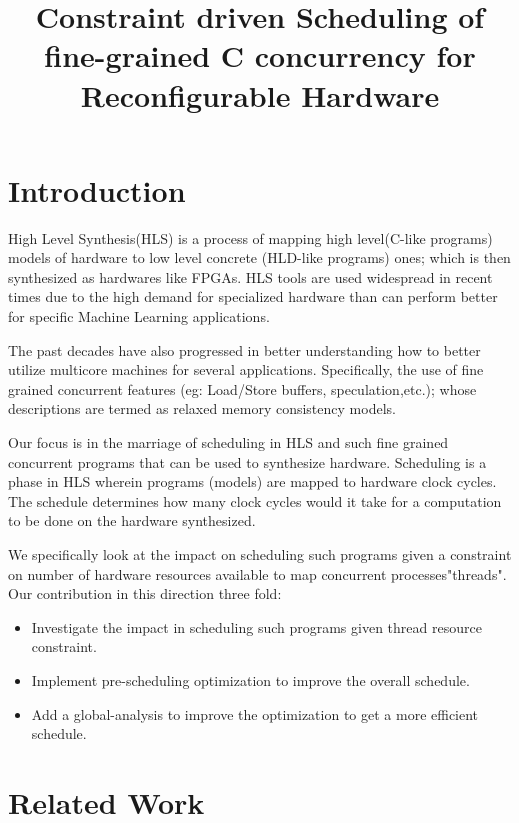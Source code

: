 \documentclass[sigplan,10pt,review]{acmart}
\title{Constraint driven Scheduling of fine-grained C concurrency for Reconfigurable Hardware}
\begin{document}
    \maketitle

    \section{Introduction}

        High Level Synthesis(HLS) is a process of mapping high level(C-like programs) models of hardware to low level concrete (HLD-like programs) ones; which is then synthesized as hardwares like FPGAs.
        HLS tools are used widespread in recent times due to the high demand for specialized hardware than can perform better for specific Machine Learning applications.  
        
        The past decades have also progressed in better understanding how to better utilize multicore machines for several applications. 
        Specifically, the use of fine grained concurrent features (eg: Load/Store buffers, speculation,etc.); whose descriptions are termed as relaxed memory consistency models.

        Our focus is in the marriage of scheduling in HLS and such fine grained concurrent programs that can be used to synthesize hardware. 
        Scheduling is a phase in HLS wherein programs (models) are mapped to hardware clock cycles. 
        The schedule determines how many clock cycles would it take for a computation to be done on the hardware synthesized. 
        
        We specifically look at the impact on scheduling such programs given a constraint on number of hardware resources available to map concurrent processes"threads".
        Our contribution in this direction three fold:
        \begin{itemize}
            \item Investigate the impact in scheduling such programs given thread resource constraint.
            \item Implement pre-scheduling optimization to improve the overall schedule.
            \item Add a global-analysis to improve the optimization to get a more efficient schedule.
        \end{itemize}


    \section{Related Work}
\end{document}
